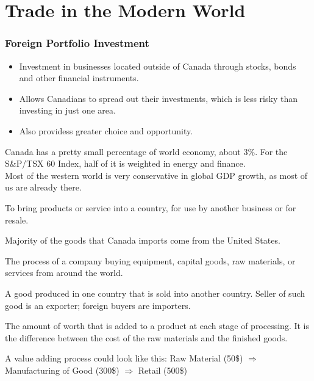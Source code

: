 
\part{Trade in the Modern World}

\section{Foreign Portfolio Investment}
\begin{itemize}
  \item Investment in businesses located outside of Canada through stocks, bonds
  and other financial instruments. 
  \item Allows Canadians to spread out their investments, which is less risky than
  investing in just one area. 
  \item Also providess greater choice and opportunity.
\end{itemize}

Canada has a pretty small percentage of world economy, about 3\%. 
For the S\&P/TSX 60 Index, half of it is weighted in energy and finance. \\
Most of the western world is very conservative in global GDP growth,
as most of us are already there. 

\begin{definition}[Importing]
  To bring products or service into a country,
  for use by another business or for resale.
\end{definition}

Majority of the goods that Canada imports 
come from the United States. 

\begin{definition}
The process of a company buying equipment, 
capital goods, raw materials, or services from around the world.
\end{definition}

\begin{definition}[Exporting]
  A good produced in one country that is sold into another 
  country. Seller of such good is an exporter; foreign buyers are importers.
\end{definition}

\begin{definition}
The amount of worth that is added to a product at 
each stage of processing. It is the difference between 
the cost of the raw materials and the finished goods.
\end{definition}

A value adding process could look like this:
Raw Material (50\$) \(\Rightarrow\) Manufacturing of Good (300\$) \(\Rightarrow\) Retail (500\$)